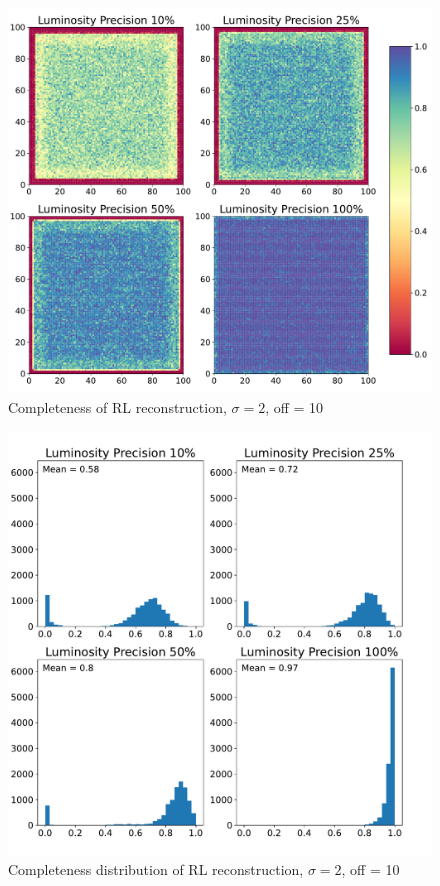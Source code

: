 \documentclass[a4paper]{article}
\begin{document}
		\newpage
		\begin{figure}[h!]
			\centering
			\includegraphics[height=0.4\textheight]{backgauss2_boards_lucy.pdf}
			\caption{Completeness of RL reconstruction, $\sigma = 2$, off = 10}
			\label{fig:bbl}
		\end{figure}
		\begin{figure}[h!]
			\centering
			\includegraphics[height=0.4\textheight]{backgauss2_hists_lucy.pdf}
			\caption{Completeness distribution of RL reconstruction, $\sigma = 2$, off = 10}
			\label{fig:bhl}
		\end{figure}
\end{document}
